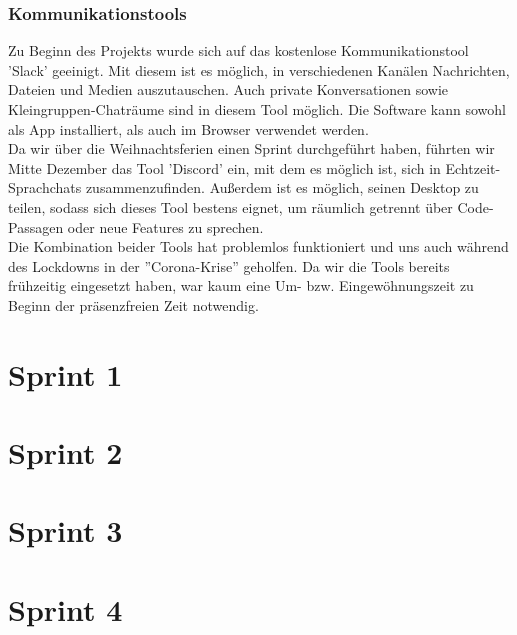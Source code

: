 \documentclass[twoside]{report}
\begin{document}
\subsubsection{Kommunikationstools}
Zu Beginn des Projekts wurde sich auf das kostenlose Kommunikationstool 'Slack' geeinigt.
Mit diesem ist es möglich, in verschiedenen Kanälen Nachrichten, Dateien und Medien auszutauschen.
Auch private Konversationen sowie Kleingruppen-Chaträume sind in diesem Tool möglich.
Die Software kann sowohl als App installiert, als auch im Browser verwendet werden.
\\Da wir über die Weihnachtsferien einen Sprint durchgeführt haben, führten wir Mitte Dezember
das Tool 'Discord' ein, mit dem es möglich ist, sich in Echtzeit-Sprachchats zusammenzufinden.
Außerdem ist es möglich, seinen Desktop zu teilen, sodass sich dieses Tool bestens eignet,
um räumlich getrennt über Code-Passagen oder neue Features zu sprechen.
\\Die Kombination beider Tools hat problemlos funktioniert und uns auch
während des Lockdowns in der ''Corona-Krise'' geholfen. Da wir die Tools bereits frühzeitig
eingesetzt haben, war kaum eine Um- bzw. Eingewöhnungszeit zu Beginn der
präsenzfreien Zeit notwendig.


\newpage


\section{Sprint 1}



\newpage

\section{Sprint 2}



\newpage

\section{Sprint 3}



\newpage

\section{Sprint 4}
\end{document}
